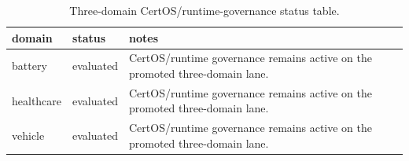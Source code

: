 \begin{table}[htbp]
\centering
\caption{Three-domain CertOS/runtime-governance status table.}
\label{tab:three-domain-paper6-matrix}
\begin{tabular}{lll}
\toprule
\textbf{domain} & \textbf{status} & \textbf{notes} \\
\midrule
battery & evaluated & CertOS/runtime governance remains active on the promoted three-domain lane. \\
healthcare & evaluated & CertOS/runtime governance remains active on the promoted three-domain lane. \\
vehicle & evaluated & CertOS/runtime governance remains active on the promoted three-domain lane. \\
\bottomrule
\end{tabular}
\end{table}

